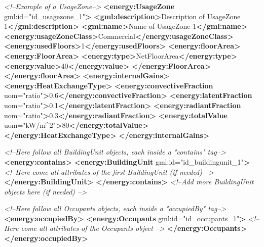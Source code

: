 \documentclass[a4paper,12pt]{article}
\newenvironment{Shaded}{}{}
\newcommand{\KeywordTok}[1]{\textcolor[rgb]{0.00,0.44,0.13}{\textbf{{#1}}}}
\newcommand{\StringTok}[1]{\textcolor[rgb]{0.25,0.44,0.63}{{#1}}}
\newcommand{\CommentTok}[1]{\textcolor[rgb]{0.38,0.63,0.69}{\textit{{#1}}}}
\newcommand{\OtherTok}[1]{\textcolor[rgb]{0.00,0.44,0.13}{{#1}}}
\newcommand{\NormalTok}[1]{{#1}}
\begin{document}
\begin{Shaded}
\begin{Highlighting}[]
\CommentTok{<!--Example of a UsageZone-->}
\KeywordTok{<energy:UsageZone}\OtherTok{ gml:id=}\StringTok{"id_usagezone_1"}\KeywordTok{>}
    \KeywordTok{<gml:description>}\NormalTok{Description of UsageZone 1}\KeywordTok{</gml:description>}
    \KeywordTok{<gml:name>}\NormalTok{Name of UsageZone 1}\KeywordTok{</gml:name>}
    \KeywordTok{<energy:usageZoneClass>}\NormalTok{Commercial}\KeywordTok{</energy:usageZoneClass>}
    \KeywordTok{<energy:usedFloors>}\NormalTok{1}\KeywordTok{</energy:usedFloors>}
    \KeywordTok{<energy:floorArea>}
        \KeywordTok{<energy:FloorArea>}
            \KeywordTok{<energy:type>}\NormalTok{NetFloorArea}\KeywordTok{</energy:type>}
            \KeywordTok{<energy:value>}\NormalTok{40}\KeywordTok{</energy:value>}
        \KeywordTok{</energy:FloorArea>}
    \KeywordTok{</energy:floorArea>}
    \KeywordTok{<energy:internalGains>}
        \KeywordTok{<energy:HeatExchangeType>}
            \KeywordTok{<energy:convectiveFraction}\OtherTok{ uom=}\StringTok{"ratio"}\KeywordTok{>}\NormalTok{0.6}\KeywordTok{</energy:convectiveFraction>}
            \KeywordTok{<energy:latentFraction}\OtherTok{ uom=}\StringTok{"ratio"}\KeywordTok{>}\NormalTok{0.1}\KeywordTok{</energy:latentFraction>}
            \KeywordTok{<energy:radiantFraction}\OtherTok{ uom=}\StringTok{"ratio"}\KeywordTok{>}\NormalTok{0.3}\KeywordTok{</energy:radiantFraction>}
            \KeywordTok{<energy:totalValue}\OtherTok{ uom=}\StringTok{"kW/m^2"}\KeywordTok{>}\NormalTok{80}\KeywordTok{</energy:totalValue>}
        \KeywordTok{</energy:HeatExchangeType>}
    \KeywordTok{</energy:internalGains>}

    \CommentTok{<!--Here follow all BuildingUnit objects, each inside a "contains" tag-->}
    \KeywordTok{<energy:contains>}
        \KeywordTok{<energy:BuildingUnit}\OtherTok{ gml:id=}\StringTok{"id_buildingunit_1"}\KeywordTok{>}
            \CommentTok{<!--Here come all attributes of the first BuildingUnit (if needed) -->}
        \KeywordTok{</energy:BuildingUnit>}
    \KeywordTok{</energy:contains>}
    \CommentTok{<!--Add more BuildingUnit objects here (if needed) -->}

    \CommentTok{<!--Here follow all Occupants objects, each inside a "occupiedBy" tag-->}
    \KeywordTok{<energy:occupiedBy>}
        \KeywordTok{<energy:Occupants}\OtherTok{ gml:id=}\StringTok{"id_occupants_1"}\KeywordTok{>}
            \CommentTok{<!--Here come all attributes of the Occupants object -->}
        \KeywordTok{</energy:Occupants>}
    \KeywordTok{</energy:occupiedBy>}


\end{Highlighting}
\end{Shaded}
\end{document}
